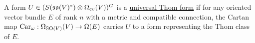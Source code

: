 \begin{comment}
\item 
Since $w$ is a  $\mathfrak{g}$-dga morphism, so is  
$w:\Omega(\mathfrak{g})\otimes\Omega(V)\to \Omega(P)\otimes\Omega(V)$ because it
is the identity on  $\Omega(V)$. We claim that $i$ is also a $\mathfrak{g}$-dga morphism. 
\begin{itemize}
	\item Graded algebra homomorphism. It is linear by construction. It also respects
		multiplication because 
	\begin{align*}
		i((\omega_1\otimes\alpha_1)(\omega_2\otimes\alpha_2))
		&= i((-1)^{\abs{\alpha_1}\abs{\omega_2}}
		(\omega_1\wedge\omega_2)\otimes(\alpha_1\wedge \alpha_2)) \\
		&= (-1)^{\abs{\alpha_1}\abs{\omega_2}}
		p_1^*(\omega_1\wedge\omega_2)\wedge p_2^*(\alpha_1\wedge \alpha_2) \\
		&= (-1)^{\abs{\alpha_1}\abs{\omega_2}}p_1^*\omega_1\wedge
		p_1^*\omega_2\wedge p_2^*\alpha_1\wedge p_2^*\alpha_2  \\
		&= p_1^*\omega_1\wedge p_2^*\alpha_1 \wedge p_1^*\omega_2\wedge p_2^*\alpha_2 \\
		&= i(\omega_1\otimes \alpha_1)\wedge i(\omega_2\otimes \alpha_2) 
	\end{align*}
	\item Commutes with $d$ and $\iota_X$. This follows from by expanding the
		definitions of $d$ and  $\iota_X$ on the tensor product, given in
		equations (\ref{eq:tensor_ops}), and the fact that the pullbacks
		$p_1^*$ and $p_2^*$ commute with  $d$ and $\iota_X$.
\end{itemize}
Therefore, $w \circ i$ is a $\mathfrak{g}$-dga morphism and descends to the map
 $\overline{w}$ on the basic subcomplexes.
\end{itemize}
\end{comment}

\begin{defn} 
	A form $U\in (S(\operatorname{\mathfrak{so}}(V)^*)\otimes \Omega_{cv}(V))^G$ is a
	\underline{universal Thom form} if for any oriented vector
	bundle $E$ of rank $n$ with a metric and compatible connection, the 
	Cartan map $\operatorname{Car}_{\omega} : \Omega_{\operatorname{SO}(V)}(V) \to \Omega(E)$
	carries $U$ to a form representing the Thom class of $E$.
\end{defn} 

